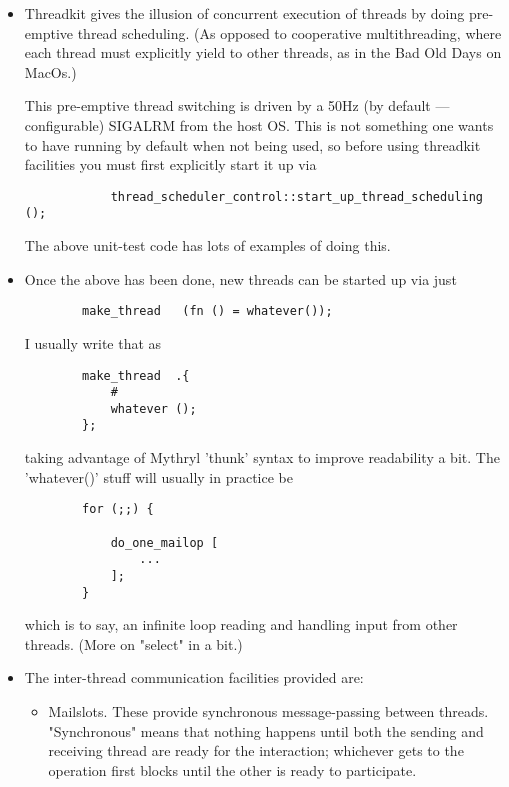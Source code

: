 \begin{itemize}
\item 
Threadkit gives the illusion of concurrent execution of threads by 
doing pre-emptive thread scheduling.  (As opposed to cooperative 
multithreading, where each thread must explicitly yield to other 
threads, as in the Bad Old Days on MacOs.) 

This pre-emptive thread switching is driven by 
a 50Hz (by default --- configurable) SIGALRM from 
the host OS.  This is not something one wants to have 
running by default when not being used, so before using 
threadkit facilities you must first explicitly start it up via 
\begin{verbatim}
            thread_scheduler_control::start_up_thread_scheduling ();
\end{verbatim}

The above unit-test code has lots of examples of doing this. 

\item 
Once the above has been done, new threads can be started 
up via just 

\begin{verbatim}
        make_thread   (fn () = whatever());
\end{verbatim}

I usually write that as 

\begin{verbatim}
        make_thread  .{
            #
            whatever ();
        };
\end{verbatim}

taking advantage of Mythryl 'thunk' syntax to improve 
readability a bit.  The 'whatever()' stuff will usually 
in practice be

\begin{verbatim}
        for (;;) {

            do_one_mailop [
                ...
            ];
        }
\end{verbatim}

which is to say, an infinite loop reading and handling 
input from other threads.  (More on "select" in a bit.) 

\item The inter-thread communication facilities provided are:


\begin{itemize}
\item 
Mailslots.  These provide synchronous message-passing 
between threads.  "Synchronous" means that nothing 
happens until both the sending and receiving thread 
are ready for the interaction;  whichever gets to the 
operation first blocks until the other is ready to 
participate. 


\end{itemize}
\end{itemize}
